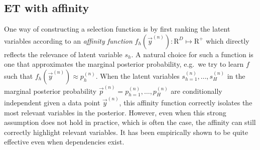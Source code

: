 %


\subsection{ET with affinity} %
One way of constructing a selection function %
is by first ranking the latent variables according to an 
\emph{affinity function} $f_h(\vec{y}^{(n)}) : \mathrm{R}^D \mapsto \mathrm{R}^{+}$
which directly reflects the relevance of latent variable $s_h$. 
A natural choice for such a function is one that approximates the marginal posterior probability,
e.g.\ we try to learn $f$ such that $f_h(\vec{y}^{(n)}) \approx p^{(n)}_h$.
%
When the latent variables $s_{h=1}^{(n)}, \dots, s_H^{(n)}$ in the marginal posterior probability $\vec{p}^{(n)} = p_{h=1}^{(n)},\dots, p_H^{(n)}$ are conditionally independent given a data point $\vec{y}^{(n)}$,  this affinity function correctly isolates the most relevant variables in the posterior.
%
However, even when this strong assumption does not hold in practice, which is often the case, 
the affinity can still correctly highlight relevant variables.
It has been empirically shown to be quite effective even when dependencies exist.

